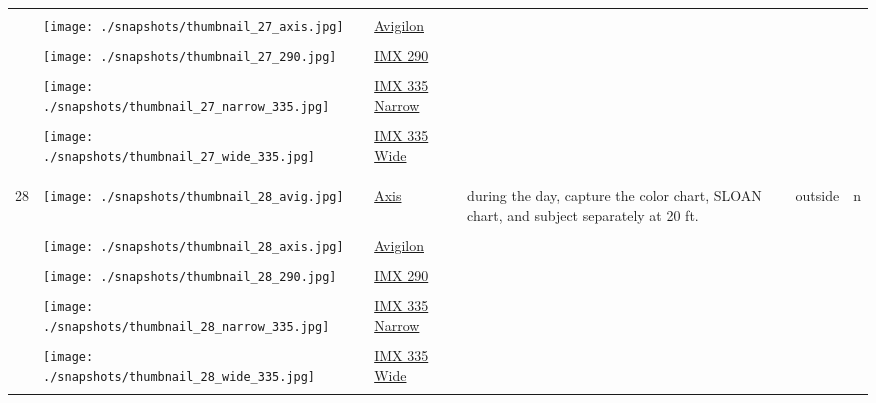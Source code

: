 \documentclass{article}%
\begin{document}
\begin{longtabu}{m{2.5cm} m{4cm} m{2cm} m{4cm} m{2cm} m{2cm}}
&&&&&\\%
&\texttt{[image: ./snapshots/thumbnail\_27\_axis.jpg]}&\href{https://drive.google.com/file/d/1zOEmE1T2UnNK1xppIS0Hn5BdgzxIt3tL/view?usp=sharing}{Avigilon}&&&\\%
&&&&&\\%
&\texttt{[image: ./snapshots/thumbnail\_27\_290.jpg]}&\href{https://drive.google.com/file/d/1vPX1dD_3ojWJhK3WufjZ6262ZseFG1O4/view?usp=sharing}{IMX 290}&&&\\%
&&&&&\\%
&\texttt{[image: ./snapshots/thumbnail\_27\_narrow\_335.jpg]}&\href{https://drive.google.com/file/d/1AReY6Teafma3kt9gcRYIgmIBFQo8TaiH/view?usp=sharing}{IMX 335 Narrow}&&&\\%
&&&&&\\%
&\texttt{[image: ./snapshots/thumbnail\_27\_wide\_335.jpg]}&\href{https://drive.google.com/file/d/1Boo_DSe0fxemjhOTLnjp158PSqgEwqgs/view?usp=sharing}{IMX 335 Wide}&&&\\%
&&&&&\\%
&&&&&\\%
\hline%
&&&&&\\%
28&\texttt{[image: ./snapshots/thumbnail\_28\_avig.jpg]}&\href{https://drive.google.com/file/d/11dhsqThNDprEJMNIs8ZKUHD66xbOhEqp/view?usp=sharing}{Axis}&during the day, capture the color chart, SLOAN chart, and subject separately at 20 ft.&outside&n\\%
&&&&&\\%
&\texttt{[image: ./snapshots/thumbnail\_28\_axis.jpg]}&\href{https://drive.google.com/file/d/1SUKAru_ntKMrqe-wWgvJhGy4jIKe8L-g/view?usp=sharing}{Avigilon}&&&\\%
&&&&&\\%
&\texttt{[image: ./snapshots/thumbnail\_28\_290.jpg]}&\href{https://drive.google.com/file/d/1eWMT3Yf_rxc-52cEWrJnKzwciEfdGh9G/view?usp=sharing}{IMX 290}&&&\\%
&&&&&\\%
&\texttt{[image: ./snapshots/thumbnail\_28\_narrow\_335.jpg]}&\href{https://drive.google.com/file/d/1UmWga_MHIMXKGxTZkUnktwnwek7iOCkM/view?usp=sharing}{IMX 335 Narrow}&&&\\%
&&&&&\\%
&\texttt{[image: ./snapshots/thumbnail\_28\_wide\_335.jpg]}&\href{https://drive.google.com/file/d/1S7FXz2v6HP4Dqx1L0Dxk616AHvkKmx3t/view?usp=sharing}{IMX 335 Wide}&&&\\%
&&&&&\\%

\end{longtabu}
\end{document}
